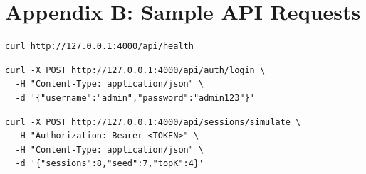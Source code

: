 \documentclass[12pt,a4paper]{report}
\begin{document}
\chapter*{Appendix B: Sample API Requests}
\begin{lstlisting}[style=codeblock]
curl http://127.0.0.1:4000/api/health
\end{lstlisting}

\begin{lstlisting}[style=codeblock]
curl -X POST http://127.0.0.1:4000/api/auth/login \
  -H "Content-Type: application/json" \
  -d '{"username":"admin","password":"admin123"}'
\end{lstlisting}

\begin{lstlisting}[style=codeblock]
curl -X POST http://127.0.0.1:4000/api/sessions/simulate \
  -H "Authorization: Bearer <TOKEN>" \
  -H "Content-Type: application/json" \
  -d '{"sessions":8,"seed":7,"topK":4}'
\end{lstlisting}
\end{document}
